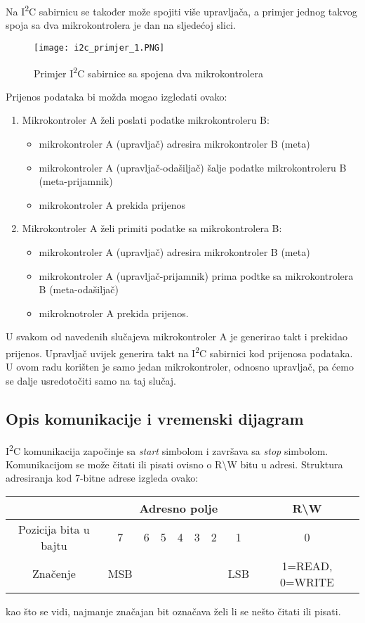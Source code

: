 Na I\textsuperscript{2}C sabirnicu se također može spojiti više upravljača, a
primjer jednog takvog spoja sa dva mikrokontrolera je dan na sljedećoj slici.
\begin{figure}[hp]
	\centering
	\texttt{[image: i2c\_primjer\_1.PNG]}
	\caption{Primjer I\textsuperscript{2}C sabirnice sa spojena dva
	mikrokontrolera}
	\label{fig:i2c_primjer_1}
\end{figure}
Prijenos podataka bi možda mogao izgledati ovako:
\begin{enumerate}
	\item Mikrokontroler A želi poslati podatke mikrokontroleru B:
	\begin{itemize}
		\item mikrokontroler A (upravljač) adresira mikrokontroler B (meta)
		\item mikrokontroler A (upravljač-odašiljač) šalje podatke
		mikrokontroleru B (meta-prijamnik)
		\item mikrokontroler A prekida prijenos
	\end{itemize}
	\item Mikrokontroler A želi primiti podatke sa mikrokontrolera B:
		\begin{itemize}
		\item mikrokontroler A (upravljač) adresira mikrokontroler B (meta)
		\item mikrokontroler A (upravljač-prijamnik) prima podtke sa
		mikrokontrolera B (meta-odašiljač)
		\item mikroknotroler A prekida prijenos.
	\end{itemize}
\end{enumerate}
U svakom od navedenih slučajeva mikrokontroler A je generirao takt i prekidao
prijenos. Upravljač uvijek generira takt na I\textsuperscript{2}C sabirnici kod
prijenosa podataka. U ovom radu korišten je samo jedan mikrokontroler, odnosno
upravljač, pa ćemo se dalje usredotočiti samo na taj slučaj.

\subsection{Opis komunikacije i vremenski dijagram}
I\textsuperscript{2}C komunikacija započinje sa \textit{start} simbolom i
završava sa \textit{stop} simbolom. Komunikacijom se može čitati ili pisati
ovisno o R\textbackslash W bitu u adresi. Struktura adresiranja kod 7-bitne
adrese izgleda ovako:
\begin{center}
	\begin{tabular}{ | c | c | c | c | c | c | c | c | c | }
		\hline
		& \multicolumn{7}{|c|}{Adresno polje} & R\textbackslash W \\
		\hline
		Pozicija bita u bajtu & 7 & 6 & 5 & 4 & 3 & 2 & 1 & 0 \\
		\hline
		Značenje & MSB & \multicolumn{5}{|c|}{} & LSB & 1=READ, 0=WRITE \\
		\hline
	\end{tabular}
\end{center}
kao što se vidi, najmanje značajan bit označava želi li se nešto čitati ili
pisati.


